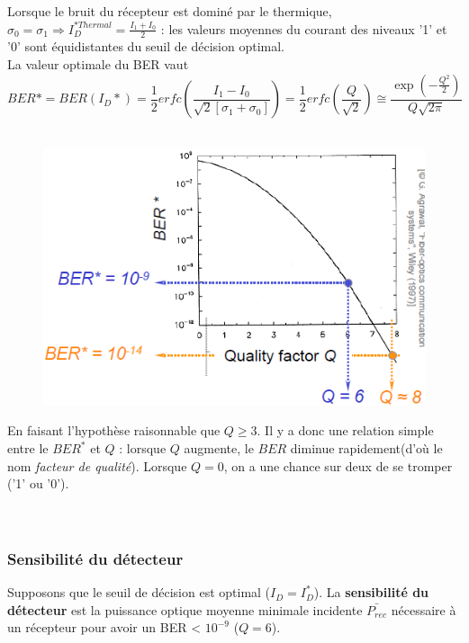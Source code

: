 Lorsque le bruit du récepteur est dominé par le thermique, $\sigma_0=\sigma_1 \Rightarrow 
I_D^{*Thermal} = \frac{{{I_1} + {I_0}}}{2}$ : les valeurs moyennes du courant des niveaux '1' et '0'
sont équidistantes du seuil de décision optimal.\\

La valeur optimale du BER vaut
\begin{equation}
BER* = BER({I_D}*) = \frac{1}{2}erfc\left( {\frac{{{I_1} - {I_0}}}{{\sqrt 2 \left[ {{\sigma _1} + {\sigma _0}} \right]}}} \right) = \frac{1}{2}erfc\left( {\frac{Q}{{\sqrt 2 }}} \right) \cong \frac{{\exp \left( { - \frac{{{Q^2}}}{2}} \right)}}{{Q\sqrt {2\pi } }}
\end{equation}\ 

\begin{figure}
\vspace{-9mm}
\includegraphics[scale=0.5]{ch5/image19}
\end{figure}
En faisant l'hypothèse raisonnable que $Q\geq 3$. Il y a donc une relation simple entre le 
$BER^*$ et $Q$ : lorsque $Q$ augmente, le $BER$ diminue rapidement(d'où le nom \textit{facteur de 
qualité}). Lorsque $Q=0$, on a une chance sur deux de se tromper ('1' ou '0').\\
\ \\
\ \\

\subsubsection{Sensibilité du détecteur}
Supposons que le seuil de décision est optimal ($I_D=I_D^*$). La \textbf{sensibilité du détecteur} 
est la puissance optique moyenne minimale incidente $\bar{P_{rec}}$ nécessaire à un récepteur 
pour avoir un BER < $10^{-9}$ ($Q=6$).\\

